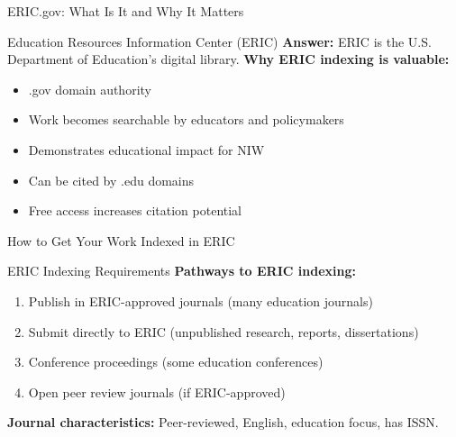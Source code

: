 \documentclass[11pt]{beamer}
\begin{document}
	
	\begin{frame}{ERIC.gov: What Is It and Why It Matters}
		\small
		\begin{block}{Education Resources Information Center (ERIC)}
			\textbf{Answer:} ERIC is the U.S. Department of Education's digital library.
			\vspace{0.1cm}
			\textbf{Why ERIC indexing is valuable:}
			\begin{itemize}
				\item .gov domain authority
				\item Work becomes searchable by educators and policymakers
				\item Demonstrates educational impact for NIW
				\item Can be cited by .edu domains
				\item Free access increases citation potential
			\end{itemize}
		\end{block}
	\end{frame}
	
	\begin{frame}{How to Get Your Work Indexed in ERIC}
		\small
		\begin{block}{ERIC Indexing Requirements}
			\textbf{Pathways to ERIC indexing:}
			\begin{enumerate}
				\item Publish in ERIC-approved journals (many education journals)
				\item Submit directly to ERIC (unpublished research, reports, dissertations)
				\item Conference proceedings (some education conferences)
				\item Open peer review journals (if ERIC-approved)
			\end{enumerate}
			\textbf{Journal characteristics:} Peer-reviewed, English, education focus, has ISSN.
		\end{block}
	\end{frame}
	
\end{document}
